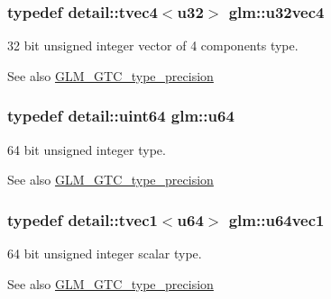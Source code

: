 \subsubsection[{u32vec4}]{\setlength{\rightskip}{0pt plus 5cm}typedef detail\+::tvec4$<$u32$>$ {\bf glm\+::u32vec4}}\label{group__gtc__type__precision_ga5cd7923918307032d87d7d5ce0257c15}
32 bit unsigned integer vector of 4 components type. \begin{DoxySeeAlso}{See also}
\hyperlink{group__gtc__type__precision}{G\+L\+M\+\_\+\+G\+T\+C\+\_\+type\+\_\+precision} 
\end{DoxySeeAlso}
\hypertarget{group__gtc__type__precision_ga71cedd4972f9cb1a5e14dfe5ab83ecd7}{}
\subsubsection[{u64}]{\setlength{\rightskip}{0pt plus 5cm}typedef detail\+::uint64 {\bf glm\+::u64}}\label{group__gtc__type__precision_ga71cedd4972f9cb1a5e14dfe5ab83ecd7}
64 bit unsigned integer type. \begin{DoxySeeAlso}{See also}
\hyperlink{group__gtc__type__precision}{G\+L\+M\+\_\+\+G\+T\+C\+\_\+type\+\_\+precision} 
\end{DoxySeeAlso}
\hypertarget{group__gtc__type__precision_ga8a4606421d8f5a874a21bc31346103cb}{}
\subsubsection[{u64vec1}]{\setlength{\rightskip}{0pt plus 5cm}typedef detail\+::tvec1$<$u64$>$ {\bf glm\+::u64vec1}}\label{group__gtc__type__precision_ga8a4606421d8f5a874a21bc31346103cb}
64 bit unsigned integer scalar type. \begin{DoxySeeAlso}{See also}
\hyperlink{group__gtc__type__precision}{G\+L\+M\+\_\+\+G\+T\+C\+\_\+type\+\_\+precision} 
\end{DoxySeeAlso}
\hypertarget{group__gtc__type__precision_gad17df8c10793777ec3081fc40b801935}{}

